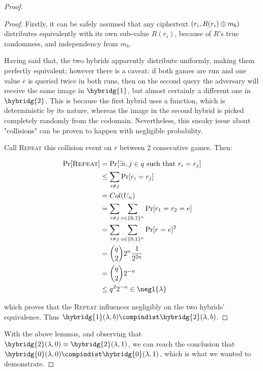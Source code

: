 \begin{proof}
    \begin{proof}
        Firstly, it can be safely assumed that any ciphertext $(r_i, R(r_i) \oplus m_b)$ distributes equivalently with its own sub-value $R(r_i)$, because of $R$'s true randomness, and independency from $m_b$.

        Having said that, the two hybrids apparently distribute uniformly, making them perfectly equivalent; however there is a caveat: if both games are run and one value $\overline{r}$ is queried twice in both runs, then on the second query the adversary will receive the same image in $\hybridg{1}$, but almost certainly a different one in $\hybridg{2}$. This is because the first hybrid uses a function, which is deterministic by its nature, whereas the image in the second hybrid is picked completely randomly from the codomain. Nevertheless, this sneaky issue about "collisions" can be proven to happen with negligible probability.

        Call \textsc{Repeat} this collision event on $\overline{r}$ between 2 consecutive games. Then:
        
        \begin{align*}
        \Pr[\textsc{Repeat}] &= \Pr[\exists i, j \in q \text{ such that } r_i = r_j] \\
            &\leq \sum_{i \neq j} \Pr[r_i=r_j] \\
            &= Col(U_n) \\
            &= \sum_{i \neq j} \sum_{e \in \{0, 1\}^n} \Pr[r_1 = r_2 = e] \\
            &= \sum_{i \neq j} \sum_{e \in \{0, 1\}^n} \Pr[r = e]^{2} \\
            &= \binom{q}{2} 2^{n} \frac{1}{2^{2n}} \\
            &= \binom{q}{2} 2^{-n} \\
            &\leq q^{2}2^{-n} \in \negl{\lambda} 
        \end{align*} 


        which proves that the \textsc{Repeat} influences negligibly on the two hybrids' equivalence. Thus $\hybridg{1}(\lambda, b) \compindist \hybridg{2}(\lambda, b)$\footnotemark.
        
    \end{proof}

    With the above lemmas, and observing that $\hybridg{2}(\lambda, 0) \equiv \hybridg{2}(\lambda, 1)$, we can reach the conclusion that $\hybridg{0}(\lambda, 0) \compindist \hybridg{0}(\lambda, 1)$, which is what we wanted to demonstrate.

\end{proof}
